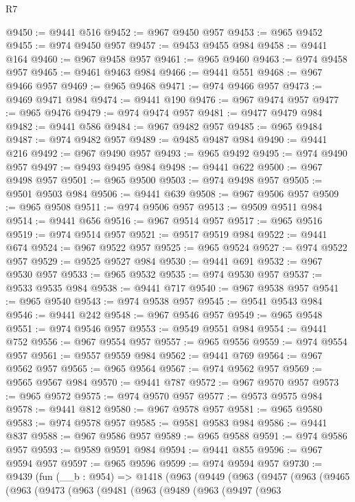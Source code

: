 \begin{lexlean}{R7}
\begin{coremodule}
@9450 := @9441 @516
@9452 := @967 @9450 @957
@9453 := @965 @9452
@9455 := @974 @9450 @957
@9457 := @9453 @9455 @984
@9458 := @9441 @164
@9460 := @967 @9458 @957
@9461 := @965 @9460
@9463 := @974 @9458 @957
@9465 := @9461 @9463 @984
@9466 := @9441 @551
@9468 := @967 @9466 @957
@9469 := @965 @9468
@9471 := @974 @9466 @957
@9473 := @9469 @9471 @984
@9474 := @9441 @190
@9476 := @967 @9474 @957
@9477 := @965 @9476
@9479 := @974 @9474 @957
@9481 := @9477 @9479 @984
@9482 := @9441 @586
@9484 := @967 @9482 @957
@9485 := @965 @9484
@9487 := @974 @9482 @957
@9489 := @9485 @9487 @984
@9490 := @9441 @216
@9492 := @967 @9490 @957
@9493 := @965 @9492
@9495 := @974 @9490 @957
@9497 := @9493 @9495 @984
@9498 := @9441 @622
@9500 := @967 @9498 @957
@9501 := @965 @9500
@9503 := @974 @9498 @957
@9505 := @9501 @9503 @984
@9506 := @9441 @639
@9508 := @967 @9506 @957
@9509 := @965 @9508
@9511 := @974 @9506 @957
@9513 := @9509 @9511 @984
@9514 := @9441 @656
@9516 := @967 @9514 @957
@9517 := @965 @9516
@9519 := @974 @9514 @957
@9521 := @9517 @9519 @984
@9522 := @9441 @674
@9524 := @967 @9522 @957
@9525 := @965 @9524
@9527 := @974 @9522 @957
@9529 := @9525 @9527 @984
@9530 := @9441 @691
@9532 := @967 @9530 @957
@9533 := @965 @9532
@9535 := @974 @9530 @957
@9537 := @9533 @9535 @984
@9538 := @9441 @717
@9540 := @967 @9538 @957
@9541 := @965 @9540
@9543 := @974 @9538 @957
@9545 := @9541 @9543 @984
@9546 := @9441 @242
@9548 := @967 @9546 @957
@9549 := @965 @9548
@9551 := @974 @9546 @957
@9553 := @9549 @9551 @984
@9554 := @9441 @752
@9556 := @967 @9554 @957
@9557 := @965 @9556
@9559 := @974 @9554 @957
@9561 := @9557 @9559 @984
@9562 := @9441 @769
@9564 := @967 @9562 @957
@9565 := @965 @9564
@9567 := @974 @9562 @957
@9569 := @9565 @9567 @984
@9570 := @9441 @787
@9572 := @967 @9570 @957
@9573 := @965 @9572
@9575 := @974 @9570 @957
@9577 := @9573 @9575 @984
@9578 := @9441 @812
@9580 := @967 @9578 @957
@9581 := @965 @9580
@9583 := @974 @9578 @957
@9585 := @9581 @9583 @984
@9586 := @9441 @837
@9588 := @967 @9586 @957
@9589 := @965 @9588
@9591 := @974 @9586 @957
@9593 := @9589 @9591 @984
@9594 := @9441 @855
@9596 := @967 @9594 @957
@9597 := @965 @9596
@9599 := @974 @9594 @957
@9730 := @9439
    (fun (__b : @954) =>
    @1418
      (@963
        (@9449
          (@963
            (@9457
              (@963
                (@9465
                  (@963
                    (@9473
                      (@963
                        (@9481
                          (@963
                            (@9489
                              (@963
                                (@9497
                                  (@963

\end{coremodule}
\end{lexlean}
